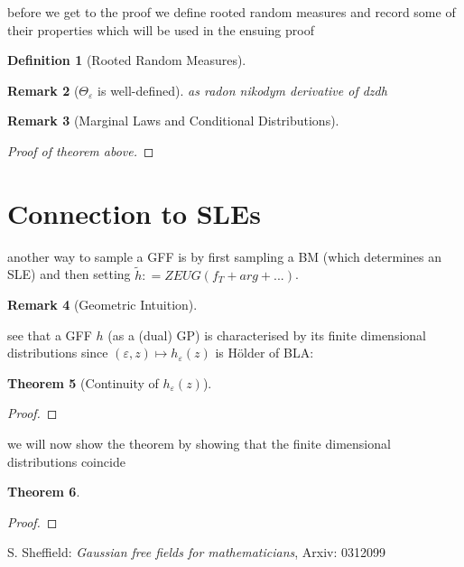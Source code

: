 \documentclass[11pt,reqno]{amsart}
\numberwithin{equation}{section}
\newtheorem{thm}{Theorem}[section]
\newtheorem{defi}[thm]{Definition}
\newtheorem{rem}[thm]{Remark}
\newcommand{\deq}{\mathrel{\mathop:}=}
\newcommand{\eps}{\varepsilon}
\begin{document}
before we get to the proof we define rooted random measures and record some of their properties which will be used in the ensuing proof

\begin{defi}[Rooted Random Measures]
	
\end{defi}
\begin{rem}[$\Theta_\eps$ is well-defined]
	as radon nikodym derivative of dzdh
\end{rem}

\begin{rem}[Marginal Laws and Conditional Distributions]
	
\end{rem}

\begin{proof}[Proof of theorem above]
	
\end{proof}

\section{Connection to SLEs}
another way to sample a GFF is by first sampling a BM (which determines an SLE) and then setting $\tilde h\deq ZEUG(f_T+arg+...)$.

\begin{rem}[Geometric Intuition]
	
\end{rem}

see that a GFF $h$ (as a (dual) GP) is characterised by its finite dimensional distributions since $(\eps,z)\mapsto h_\eps(z)$ is H\"older of BLA:

\begin{thm}[Continuity of $h_\eps(z)$]
	
\end{thm}
\begin{proof}
	
\end{proof}

we will now show the theorem by showing that the finite dimensional distributions coincide

\begin{thm}
	
\end{thm}
\begin{proof}
	
\end{proof}

\begin{thebibliography}{00}
 S. Sheffield: \emph{Gaussian free fields for mathematicians}, Arxiv: 0312099
\end{thebibliography}
\end{document}

